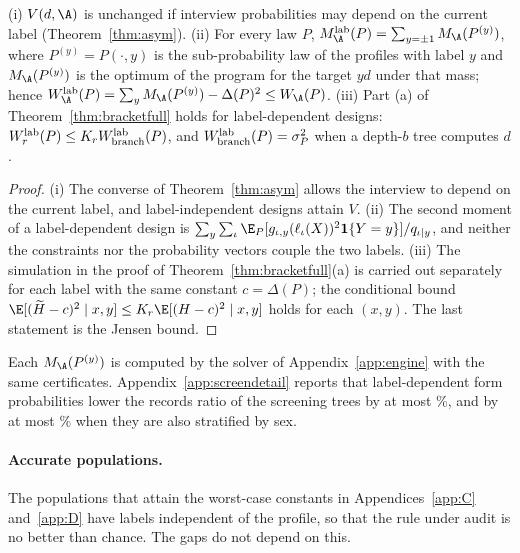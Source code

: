 \begin{proposition}\label{prop:labeldesign}
\textup{(i)} $V(d,\A)$ is unchanged if interview probabilities may depend on
the current label (Theorem~\ref{thm:asym}).
\textup{(ii)} For every law $P$, $M_{\A}^{\rm lab}(P)=\sum_{y=\pm1}M_\A(P^{(y)})$,
where $P^{(y)}=P(\cdot,y)$ is the sub-probability law of the profiles with
label $y$ and $M_\A(P^{(y)})$ is the optimum of the program for the target
$yd$ under that mass; hence $W^{\rm lab}_\A(P)=\sum_yM_\A(P^{(y)})-\Delta(P)^2\le W_\A(P)$.
\textup{(iii)} Part \textup{(a)} of Theorem~\ref{thm:bracketfull} holds for
label-dependent designs: $W^{\rm lab}_r(P)\le K_rW^{\rm lab}_{\rm branch}(P)$,
and $W^{\rm lab}_{\rm branch}(P)=\sigma_P^2$ when a depth-$b$ tree computes
$d$.
\end{proposition}
\begin{proof}
(i) The converse of Theorem~\ref{thm:asym} allows the interview to depend on
the current label, and label-independent designs attain $V$. (ii) The second
moment of a label-dependent design is
$\sum_y\sum_\iota\E_P[g_{\iota,y}(\ell_\iota(X))^2\mathbf 1\{Y=y\}]/q_{\iota\mid y}$,
and neither the constraints nor the probability vectors couple the two
labels. (iii) The simulation in the proof of
Theorem~\ref{thm:bracketfull}(a) is carried out separately for each label
with the same constant $c=\Delta(P)$; the conditional bound
$\E[(\widetilde H-c)^2\mid x,y]\le K_r\E[(H-c)^2\mid x,y]$ holds for each
$(x,y)$. The last statement is the Jensen bound.
\end{proof}
Each $M_\A(P^{(y)})$ is computed by the solver of Appendix~\ref{app:engine}
with the same certificates. Appendix~\ref{app:screendetail} reports that
label-dependent form probabilities lower the records ratio of the screening
trees by at most \nLabelMax\%, and by at most \nStratMax\% when they are also
stratified by sex.

\paragraph{Accurate populations.}
The populations that attain the worst-case constants in Appendices~\ref{app:C} and~\ref{app:D} have labels independent of the profile, so that the rule under audit is no better than chance. The gaps do not depend on this.

